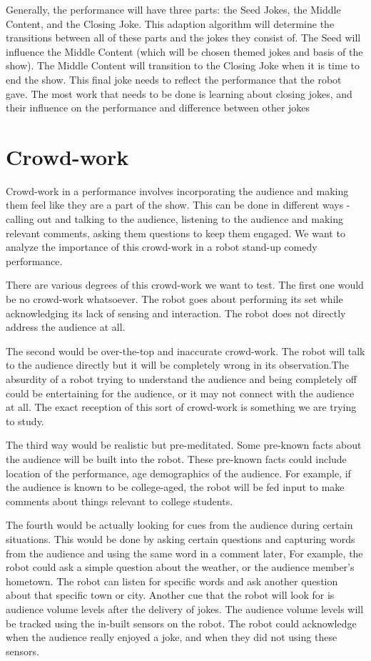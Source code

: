 \documentclass[onecolumn, draftclsnofoot,10pt, compsoc]{IEEEtran}
\begin{document}
Generally, the performance will have three parts: the Seed Jokes, the Middle Content, and the Closing Joke. This adaption algorithm will determine the transitions between all of these parts and the jokes they consist of. The Seed will influence the Middle Content (which will be chosen themed jokes and basis of the show). The Middle Content will transition to the Closing Joke when it is time to end the show. This final joke needs to reflect the performance that the robot gave. The most work that needs to be done is learning about closing jokes, and their influence on the performance and difference between other jokes


\section{Crowd-work}
Crowd-work in a performance involves incorporating the audience and making them feel like they are a part of the show. This can be done in different ways -  calling out and talking to the audience, listening to the audience and making relevant comments, asking them questions to keep them engaged. We want to analyze the importance of this crowd-work in a robot stand-up comedy performance.

There are various degrees of this crowd-work we want to test. The first one would be no crowd-work whatsoever. The robot goes about performing its set while acknowledging its lack of sensing and interaction. The robot does not directly address the audience at all.

The second would be over-the-top and inaccurate crowd-work. The robot will talk to the audience directly but it will be completely wrong in its observation.The absurdity of a robot trying to understand the audience and being completely off could be entertaining for the audience, or it may not connect with the audience at all. The exact reception of this sort of crowd-work is something we are trying to study.

The third way would be realistic but pre-meditated. Some pre-known facts about the audience will be built into the robot. These pre-known facts could include location of the performance, age demographics of the audience. For example, if the audience is known to be college-aged, the robot will be fed input to make comments about things relevant to college students.

The fourth would be actually looking for cues from the audience during certain situations. This would be done by asking certain questions and capturing words from the audience and using the same word in a comment later,  For example, the robot could ask a simple question about the weather, or the audience member's hometown. The robot can listen for specific words and ask another question about that specific town or city. Another cue that the robot will look for is audience volume levels after the delivery of jokes. The audience volume levels will be tracked using the in-built sensors on the robot. The robot could acknowledge when the audience really enjoyed a joke, and when they did not using these sensors.
\end{document}
